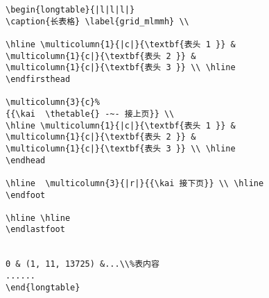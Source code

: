 \begin{shaded}
\begin{Verbatim}
\begin{longtable}{|l|l|l|}
\caption{长表格} \label{grid_mlmmh} \\

\hline \multicolumn{1}{|c|}{\textbf{表头 1 }} &
\multicolumn{1}{c|}{\textbf{表头 2 }} &
\multicolumn{1}{c|}{\textbf{表头 3 }} \\ \hline
\endfirsthead

\multicolumn{3}{c}%
{{\kai  \thetable{} -~- 接上页}} \\
\hline \multicolumn{1}{|c|}{\textbf{表头 1 }} &
\multicolumn{1}{c|}{\textbf{表头 2 }} &
\multicolumn{1}{c|}{\textbf{表头 3 }} \\ \hline
\endhead

\hline  \multicolumn{3}{|r|}{{\kai 接下页}} \\ \hline
\endfoot

\hline \hline
\endlastfoot


0 & (1, 11, 13725) &...\\%表内容
......
\end{longtable}
\end{Verbatim}
\end{shaded}
\normalcolor

